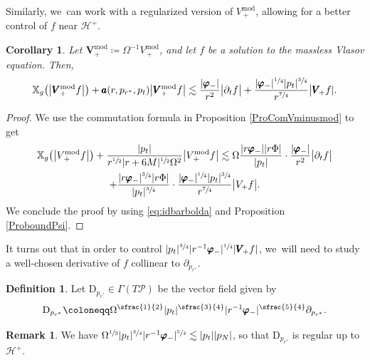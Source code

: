 \documentclass[JEP,XML,SOM,Unicode,published]{cedram}
\theoremstyle{plain}
\newtheorem{corollary}[proposition]{Corollary}
\theoremstyle{definition}
\newtheorem{definition}[proposition]{Definition}
\newtheorem{remark}[proposition]{Remark}
\newcommand\T{{\mathbb{X}}}
\renewcommand\H{{\mathcal{H}^+}}
\begin{document}
Similarly, we~can work with a regularized version of $V_{\, +}^{\mathrm{mod}}$, allowing for a better control of $f$ near $\mathcal{H}^+$.
\begin{corollary}\label{corVminusmod}
Let $\pmb{V}_+^{ \mathrm{mod}}\coloneqq \Omega^{-1} V_{\, +}^{\mathrm{mod}}$, and let $f$ be a solution to the massless Vlasov equation. Then,
\begin{align*}
\T_g \bigl(\big| \pmb{V}_{ +}^{ \mathrm{mod}} f \big| \bigr) + \pmb{a}(r,p_{r^*},p_t) \big| \pmb{V}_+^{ \mathrm{mod}} f \big| \lesssim \frac{|\pmb{\varphi}_-|}{r^2 } \big| \partial_t f \big|+\frac{|\pmb{\varphi}_-|^{\sfrac{1}{4}}|p_t|^{\sfrac{3}{4}}}{r^{\sfrac{7}{4}} } \big| \pmb{V}_{\! +} f|.
\end{align*}
\end{corollary}
\begin{proof}
We use the commutation formula in Proposition \ref{ProComVminusmod} to get
\begin{multline*}
\T_g \bigl(\big| V_{\, +}^{\mathrm{mod}} f \big| \bigr) + \frac{|p_t|}{r^{\sfrac{1}{2}}|r+6M|^{\sfrac{1}{2}}\Omega^2} \big| V_{\, +}^{\mathrm{mod}} f \big| \lesssim \Omega\frac{ |r\pmb{\varphi}_-||r\Phi|}{|p_t|} \cdot \frac{|\pmb{\varphi}_-|}{r^2} \big| \partial_t f \big| \\
+ \frac{|r\pmb{\varphi}_-|^{\sfrac{3}{4}}|r\Phi|}{|p_t|^{\sfrac{3}{4}}}\cdot\frac{|\pmb{\varphi}_-|^{\sfrac{1}{4}}|p_t|^{\sfrac{3}{4}}}{r^{\sfrac{7}{4}} } \big| V_+ f \big|.
\end{multline*}
We conclude the proof by using \eqref{eq:idbarbolda} and Proposition \ref{ProboundPsi}.
\end{proof}

It turns out that in order to control $|p_t|^{\sfrac{3}{4}}|r^{-1} \pmb{\varphi}_-|^{\sfrac{1}{4}} | \pmb{V}_{\! +} f|$, we~will need to study a well-chosen derivative of $f$ collinear to $\partial_{p_{r^*}}$.

\begin{definition}\label{DefDpr}
Let $\mathrm{D}_{p_{r^*}} \! \in \Gamma (T \mathcal{P})$ be the vector field given by
\[
\mathrm{D}_{p_{r^*}} \coloneqq \Omega^{\sfrac{1}{2}}|p_t|^{\sfrac{3}{4}} |r^{-1} \pmb{\varphi}_-|^{\sfrac{5}{4}} \partial_{p_{r^*}}.
\]
\end{definition}

\begin{remark}
We have $\Omega^{\sfrac{1}{2}}|p_t|^{\sfrac{3}{4}} |r^{-1} \pmb{\varphi}_-|^{\sfrac{5}{4}} \lesssim |p_t||p_N|$, so that $\mathrm{D}_{p_{r^*}}$ is regular up to $\H$.
\end{remark}
\end{document}

